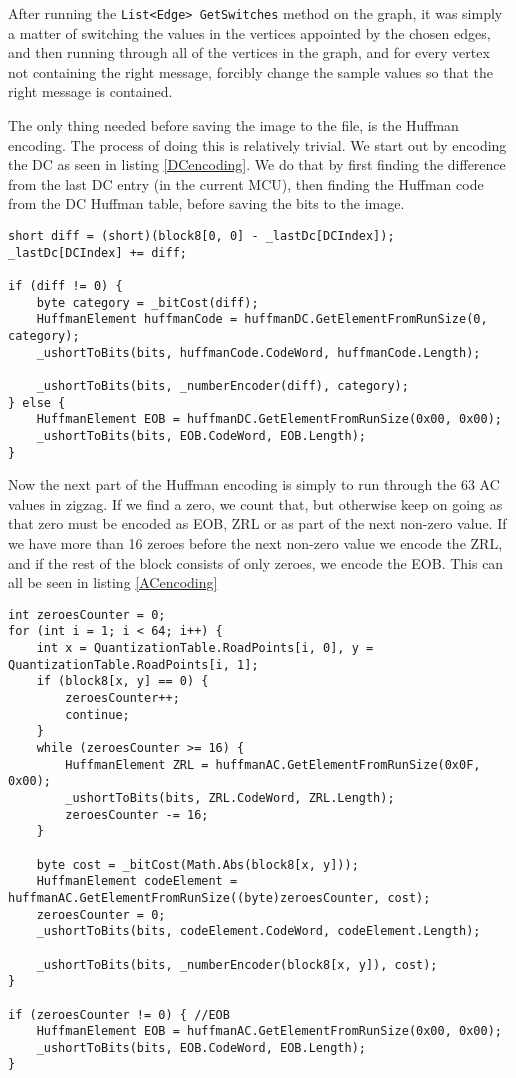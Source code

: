After running the \lstinline|List<Edge> GetSwitches| method on the graph, it was simply a matter of switching the values in the vertices appointed by the chosen edges, and then running through all of the vertices in the graph, and for every vertex not containing the right message, forcibly change the sample values so that the right message is contained.


The only thing needed before saving the image to the file, is the Huffman encoding.
The process of doing this is relatively trivial.
We start out by encoding the DC as seen in listing \ref{DCencoding}. We do that by first finding the difference from the last DC entry (in the current MCU), then finding the Huffman code from the DC Huffman table, before saving the bits to the image.

\begin{lstlisting}[label=DCencoding,caption={Encoding DC coefficient into the image \textbf{File: }JPEGImage.cs}]
short diff = (short)(block8[0, 0] - _lastDc[DCIndex]);
_lastDc[DCIndex] += diff;

if (diff != 0) {
    byte category = _bitCost(diff);
    HuffmanElement huffmanCode = huffmanDC.GetElementFromRunSize(0, category);
    _ushortToBits(bits, huffmanCode.CodeWord, huffmanCode.Length);

    _ushortToBits(bits, _numberEncoder(diff), category);
} else {
    HuffmanElement EOB = huffmanDC.GetElementFromRunSize(0x00, 0x00);
    _ushortToBits(bits, EOB.CodeWord, EOB.Length);
}
\end{lstlisting}

Now the next part of the Huffman encoding is simply to run through the 63 AC values in zigzag.
If we find a zero, we count that, but otherwise keep on going as that zero must be encoded as EOB, ZRL or as part of the next non-zero value.
If we have more than 16 zeroes before the next non-zero value we encode the ZRL, and if the rest of the block consists of only zeroes, we encode the EOB. This can all be seen in listing \ref{ACencoding}

\begin{lstlisting}[label=ACencoding,caption={Encoding AC coefficients into the image \textbf{File: }JPEGImage.cs}]
int zeroesCounter = 0;
for (int i = 1; i < 64; i++) {
    int x = QuantizationTable.RoadPoints[i, 0], y = QuantizationTable.RoadPoints[i, 1];
    if (block8[x, y] == 0) {
        zeroesCounter++;
        continue;
    }
    while (zeroesCounter >= 16) {
        HuffmanElement ZRL = huffmanAC.GetElementFromRunSize(0x0F, 0x00);
        _ushortToBits(bits, ZRL.CodeWord, ZRL.Length);
        zeroesCounter -= 16;
    }

    byte cost = _bitCost(Math.Abs(block8[x, y]));
    HuffmanElement codeElement = huffmanAC.GetElementFromRunSize((byte)zeroesCounter, cost);
    zeroesCounter = 0;
    _ushortToBits(bits, codeElement.CodeWord, codeElement.Length);

    _ushortToBits(bits, _numberEncoder(block8[x, y]), cost);
}

if (zeroesCounter != 0) { //EOB
    HuffmanElement EOB = huffmanAC.GetElementFromRunSize(0x00, 0x00);
    _ushortToBits(bits, EOB.CodeWord, EOB.Length);
}
\end{lstlisting}

